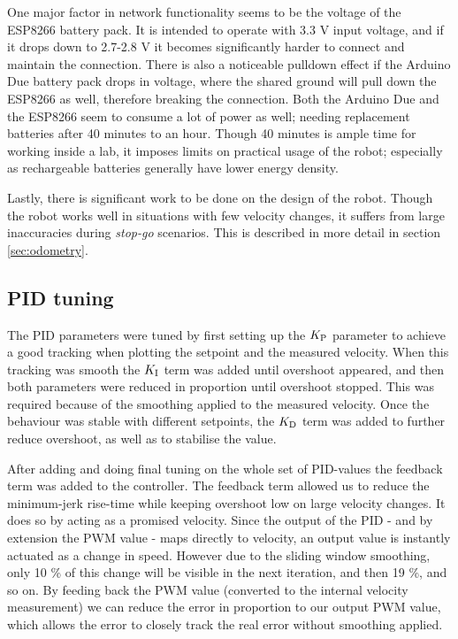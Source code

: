 \documentclass[11pt]{article}
\begin{document}
One major factor in network functionality seems to be the voltage of the ESP8266
battery pack. It is intended to operate with 3.3 V input voltage, and if it
drops down to 2.7-2.8 V it becomes significantly harder to connect and maintain
the connection. There is also a noticeable pulldown effect if the Arduino Due
battery pack drops in voltage, where the shared ground will pull down the
ESP8266 as well, therefore breaking the connection. Both the Arduino Due and the
ESP8266 seem to consume a lot of power as well; needing replacement batteries
after 40 minutes to an hour. Though 40 minutes is ample time for working inside
a lab, it imposes limits on practical usage of the robot; especially as
rechargeable batteries generally have lower energy density. \par

Lastly, there is significant work to be done on the design of the robot. Though
the robot works well in situations with few velocity changes, it suffers from
large inaccuracies during \emph{stop-go} scenarios. This is described in more
detail in section \vref{sec:odometry}.
\subsection{PID tuning}
\label{subsec:pidt}
The PID parameters were tuned by first setting up the ${K_{\textup{P}}}$ parameter to
achieve a good tracking when plotting the setpoint and the measured
velocity. When this tracking was smooth the ${K_{\textup{I}}}$ term was added until
overshoot appeared, and then both parameters were reduced in proportion until
overshoot stopped. This was required because of the smoothing applied to the
measured velocity. Once the behaviour was stable with different setpoints, the
${K_{\textup{D}}}$ term was added to further reduce overshoot, as well as to stabilise
the value. \par

After adding and doing final tuning on the whole set of PID-values the feedback
term was added to the controller. The feedback term allowed us to reduce the
minimum-jerk rise-time while keeping overshoot low on large velocity changes. It
does so by acting as a promised velocity. Since the output of the PID - and by
extension the PWM value - maps directly to velocity, an output value is
instantly actuated as a change in speed. However due to the sliding window smoothing, only 10 \% of this change will
be visible in the next iteration, and then
19 \%, and so on. By feeding back the PWM value (converted to the internal
velocity measurement) we can reduce the error in proportion to our output PWM
value, which allows the error to closely track the real error without smoothing
applied. \par
\end{document}

